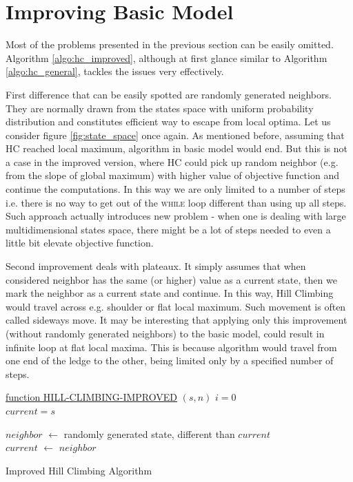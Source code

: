 \documentclass{mini}
\begin{document}
\section{Improving Basic Model} \label{sec:improving basic model}
Most of the problems presented in the previous section can be easily omitted. Algorithm \ref{algo:hc_improved}, although at first glance similar to Algorithm \ref{algo:hc_general}, tackles the issues very effectively. 

First difference that can be easily spotted are randomly generated neighbors. They are normally drawn from the states space with uniform probability distribution and constitutes efficient way to escape from local optima. Let us consider figure \ref{fig:state_space} once again. As mentioned before, assuming that HC reached local maximum, algorithm in basic model would end. But this is not a case in the improved version, where HC could pick up random neighbor (e.g. from the slope of global maximum) with higher value of objective function and continue the computations. In this way we are only limited to a number of steps i.e. there is no way to get out of the \textsc{while} loop different than using up all steps. Such approach actually introduces new problem - when one is dealing with large multidimensional states space, there might be a lot of steps needed to even a little bit elevate objective function. 

Second improvement deals with plateaux. It simply assumes that when considered neighbor has the same (or higher) value as a current state, then we mark the neighbor as a current state and continue. In this way, Hill Climbing would travel across e.g. shoulder or flat local maximum. Such movement is often called sideways move. It may be interesting that applying only this improvement (without randomly generated neighbors) to the basic model, could result in infinite loop at flat local maxima. This is because algorithm would travel from one end of the ledge to the other, being limited only by a specified number of steps.

\begin{algorithm}[H]
    \underline{function HILL-CLIMBING-IMPROVED} $(s, n)$\;
    $i = 0$ \\
    $current = s$ \\
    {
    	$neighbor$ $\gets$ randomly generated state, different than $current$ \\
    	
    	{
			$current$ $\gets$ $neighbor$
   		}
   		  		
    }
    \caption{Improved Hill Climbing Algorithm}
    \label{algo:hc_improved}
\end{algorithm}
\end{document}

